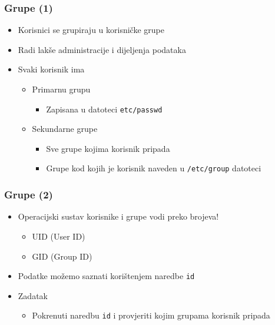 \documentclass{beamer}
\newcommand{\shell}[1]{\texttt{#1}}
\begin{document}
\begin{frame}[t]
\frametitle{Grupe (1)}
\begin{itemize}
  \item Korisnici se grupiraju u korisničke grupe
  \item Radi lakše administracije i dijeljenja podataka
  \item Svaki korisnik ima
  \begin{itemize}
    \item Primarnu grupu
    \begin{itemize}
      \item Zapisana u datoteci \shell{etc/passwd} 
    \end{itemize}
    \item Sekundarne grupe
    \begin{itemize}
      \item  Sve grupe kojima korisnik pripada
      \item  Grupe kod kojih je korisnik naveden u \shell{/etc/group} 
                datoteci
    \end{itemize}
  \end{itemize}
\end{itemize}
\end{frame}

\begin{frame}[t]
\frametitle{Grupe (2)}
\begin{itemize}
  \item Operacijski sustav korisnike i grupe vodi preko brojeva!
  \begin{itemize}
    \item UID (User ID)
    \item GID (Group ID)
  \end{itemize}
  \item Podatke možemo saznati korištenjem naredbe \shell{id}
  \item Zadatak
  \begin{itemize}
    \item Pokrenuti naredbu \shell{id} i provjeriti kojim grupama korisnik
          pripada
  \end{itemize}
\end{itemize}
\end{frame}
\end{document}
